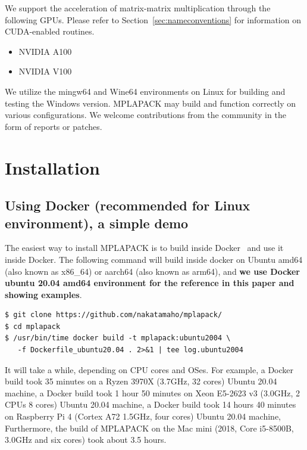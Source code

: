 \documentclass[12pt]{article}
\begin{document}
We support the acceleration of matrix-matrix multiplication through the following GPUs. Please refer to Section~\ref{sec:nameconventions} for information on CUDA-enabled routines.
\begin{itemize}
\item NVIDIA A100
\item NVIDIA V100
\end{itemize}

We utilize the mingw64 and Wine64 environments on Linux for building and testing the Windows version. MPLAPACK may build and function correctly on various configurations. We welcome contributions from the community in the form of reports or patches.

\section{Installation}
\label{sec:howtoinstall}
\subsection{Using Docker (recommended for Linux environment), a simple demo}
The easiest way to install MPLAPACK is to build inside Docker~\cite{merkel2014docker} and use it inside Docker.
The following command will build inside docker on Ubuntu amd64 (also known as x86\_64) or aarch64 (also known as arm64), and {\bf we use Docker ubuntu 20.04 amd64 environment for the reference in this paper and showing examples}.

\begin{verbatim}
$ git clone https://github.com/nakatamaho/mplapack/
$ cd mplapack
$ /usr/bin/time docker build -t mplapack:ubuntu2004 \
   -f Dockerfile_ubuntu20.04 . 2>&1 | tee log.ubuntu2004
\end{verbatim}
It will take a while, depending on CPU cores and OSes. For example, a Docker build took 35 minutes on a Ryzen 3970X (3.7GHz, 32 cores) Ubuntu 20.04 machine,
 a Docker build took 1 hour 50 minutes on Xeon E5-2623 v3 (3.0GHz, 2 CPUs 8 cores) Ubuntu 20.04 machine,
 a Docker build took 14 hours 40 minutes on Raspberry Pi 4 (Cortex A72 1.5GHz, four cores) Ubuntu 20.04 machine,
Furthermore, the build of MPLAPACK on the Mac mini (2018, Core i5-8500B, 3.0GHz and six cores) took about 3.5 hours.
\end{document}
